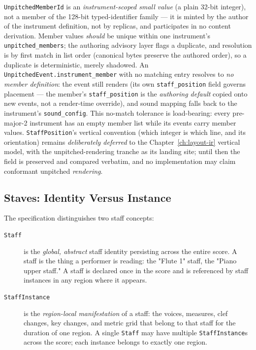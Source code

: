 \documentclass[11pt,letterpaper]{report}
\begin{document}
\texttt{UnpitchedMemberId} is an \emph{instrument-scoped small value}
(a plain 32-bit integer), not a member of the 128-bit typed-identifier
family --- it is minted by the author of the instrument definition, not
by replicas, and participates in no content derivation. Member values
\emph{should} be unique within one instrument's
\texttt{unpitched\_members}; the authoring advisory layer flags a
duplicate, and resolution is by first match in list order (canonical
bytes preserve the authored order), so a duplicate is deterministic,
merely shadowed. An \texttt{UnpitchedEvent.instrument\_member} with no
matching entry resolves to \emph{no member definition}: the event still
renders (its own \texttt{staff\_position} field governs placement ---
the member's \texttt{staff\_position} is the \emph{authoring default}
copied onto new events, not a render-time override), and sound mapping
falls back to the instrument's \texttt{sound\_config}. This
no-match tolerance is load-bearing: every pre-major-2 instrument has an
empty member list while its events carry member values.
\texttt{StaffPosition}'s vertical convention (which integer is which
line, and its orientation) remains \emph{deliberately deferred} to the
Chapter~\ref{ch:layout-ir} vertical model, with the unpitched-rendering
tranche as its landing site; until then the field is preserved and
compared verbatim, and no implementation may claim conformant unpitched
\emph{rendering}.

\subsection{Staves: Identity Versus Instance}
\label{sec:graph:staff-identity}

The specification distinguishes two staff concepts:

\begin{description}
  \item[\texttt{Staff}] is the \emph{global, abstract} staff identity
    persisting across the entire score. A staff is the thing a
    performer is reading: the "Flute 1" staff, the "Piano upper
    staff." A staff is declared once in the score and is referenced
    by staff instances in any region where it appears.
  \item[\texttt{StaffInstance}] is the \emph{region-local manifestation}
    of a staff: the voices, measures, clef changes, key changes, and
    metric grid that belong to that staff for the duration of one
    region. A single \texttt{Staff} may have multiple
    \texttt{StaffInstance}s across the score; each instance belongs
    to exactly one region.
\end{description}
\end{document}
